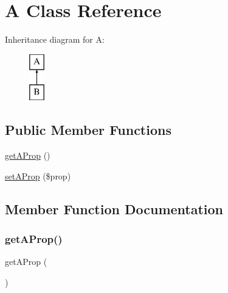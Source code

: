 \hypertarget{class_deep_copy_1_1f001_1_1_a}{}\section{A Class Reference}
\label{class_deep_copy_1_1f001_1_1_a}
Inheritance diagram for A\+:\begin{figure}[H]
\begin{center}
\leavevmode
\includegraphics[height=2.000000cm]{class_deep_copy_1_1f001_1_1_a}
\end{center}
\end{figure}
\subsection*{Public Member Functions}
\begin{DoxyCompactItemize}
\item 
\mbox{\hyperlink{class_deep_copy_1_1f001_1_1_a_a3c232655009a5149eda2aee9223b98c8}{get\+A\+Prop}} ()
\item 
\mbox{\hyperlink{class_deep_copy_1_1f001_1_1_a_a703a721755190f59400a474c3e8cd8da}{set\+A\+Prop}} (\$prop)
\end{DoxyCompactItemize}


\subsection{Member Function Documentation}
\mbox{\label{class_deep_copy_1_1f001_1_1_a_a3c232655009a5149eda2aee9223b98c8}} 
\subsubsection{\texorpdfstring{get\+A\+Prop()}{getAProp()}}
{\footnotesize\ttfamily get\+A\+Prop (\begin{DoxyParamCaption}{ }\end{DoxyParamCaption})}

\mbox{\label{class_deep_copy_1_1f001_1_1_a_a703a721755190f59400a474c3e8cd8da}} 
